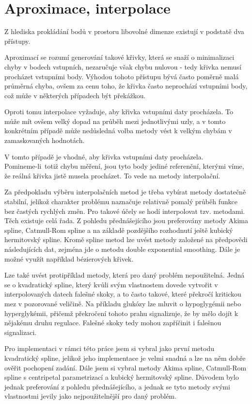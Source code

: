 \documentclass[]{thesiskiv}
\begin{document}
\section{Aproximace, interpolace}\label{anal:aproxinter}

Z hlediska prokládání bodů v prostoru libovolné dimenze existují v podstatě dva přístupy.

Aproximací se rozumí generování takové křivky, která se snaží o minimalizaci chyby v bodech vstupních, nezaručuje však chybu nulovou - tedy křivka nemusí procházet vstupními body. Výhodou tohoto přístupu bývá často poměrně malá průměrná chyba, ovšem za cenu toho, že křivka často neprochází vstupními body, což může v některých případech být překážkou.

Oproti tomu interpolace vyžaduje, aby křivka vstupními daty procházela. To může mít ovšem velký dopad na průběh mezi jednotlivými uzly, a v tomto konkrétním případě může nedůsledná volba metody vést k velkým chybám v zamaskovaných hodnotách.

V tomto případě je vhodné, aby křivka vstupními daty procházela.\\ Pomineme-li~totiž chybu měření, jsou tyto body jediné referenční, kterými víme, že reálná křivka jistě musela procházet. To vede na metody interpolační.

Za předpokladu výběru interpolačních metod je třeba vybírat metody dostatečně stabilní, jelikož charakter problému naznačuje relativně pomalý průběh funkce bez častých rychlých změn. Pro takové účely se hodí interpolovat tzv.  metodami. Těch existuje celá řada. Z pohledu přednášejícího jsou preferovány metody Akima spline, Catmull-Rom spline a na základě pozdějšího rozhodnutí ještě kubický hermitovský spline. Kromě spline metod lze uvést metody založené na předpovědi následujících dat, zejména jde o metodu double exponential smoothing. Dále je možné využít například bézierových křivek.

Lze také uvést protipříklad metody, která pro daný problém nepoužitelná. Jedná se o kvadratický spline, který kvůli svým vlastnostem dovede vytvořit v interpolovaných datech falešné skoky, a to často takové, které překročí kritickou mez v pozorované veličině. Na příkladu glukózy lze mluvit o hypoglygémii nebo hyperglykémii, přičemž překročení tohoto prahu signalizuje, že by mělo dojít k nějakému druhu regulace. Falešné skoky tedy mohou zapříčinit i falešnou signalizaci.

Pro implementaci v rámci této práce jsem si vybral jako první metodu kvadratický spline, jelikož jeho implementace je velmi snadná a lze na něm dobře ověřit pochopení zadání. Dále jsem si vybral metody Akima spline, Catmull-Rom spline s centripetal parametrizací a kubický hermitovský spline. Důvodem bylo jednak preferování z pohledu přednášejícího, a jednak se tyto metody svými vlastnostmi jevily jako nejpoužitelnější pro daný problém.
\end{document}
